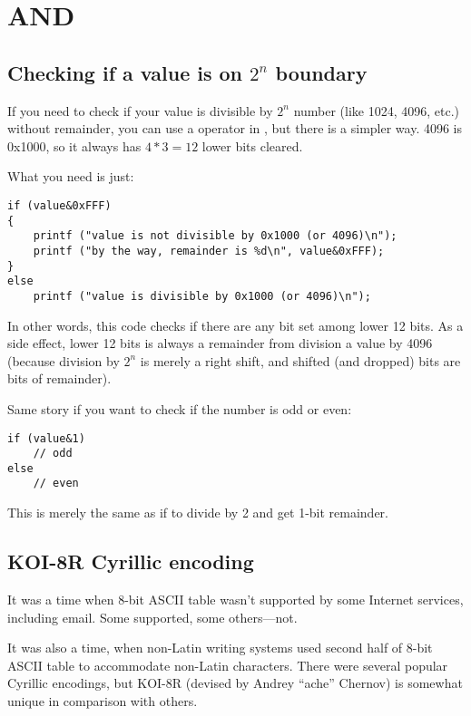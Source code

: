 \section{AND}

\subsection{Checking if a value is on $2^n$ boundary}

If you need to check if your value is divisible by $2^n$ number (like 1024, 4096, etc.) without remainder,
you can use a \TT{\%} operator in \CCpp, but there is a simpler way.
4096 is 0x1000, so it always has $4*3=12$ lower bits cleared.

What you need is just:

\begin{lstlisting}[style=customc]
if (value&0xFFF)
{
	printf ("value is not divisible by 0x1000 (or 4096)\n");
	printf ("by the way, remainder is %d\n", value&0xFFF);
}
else
	printf ("value is divisible by 0x1000 (or 4096)\n");
\end{lstlisting}

In other words, this code checks if there are any bit set among lower 12 bits.
As a side effect, lower 12 bits is always a remainder from division a value by 4096 (because division by $2^n$
is merely a right shift, and shifted (and dropped) bits are bits of remainder).

Same story if you want to check if the number is odd or even:

\begin{lstlisting}[style=customc]
if (value&1)
	// odd
else
	// even
\end{lstlisting}

This is merely the same as if to divide by 2 and get 1-bit remainder.

\subsection{KOI-8R Cyrillic encoding}

It was a time when 8-bit \ac{ASCII} table wasn't supported by some Internet services, including email.
Some supported, some others---not.

It was also a time, when non-Latin writing systems used second half of 8-bit ASCII table to accommodate non-Latin characters.
There were several popular Cyrillic encodings, but KOI-8R (devised by Andrey ``ache'' Chernov)
is somewhat unique in comparison with others.

